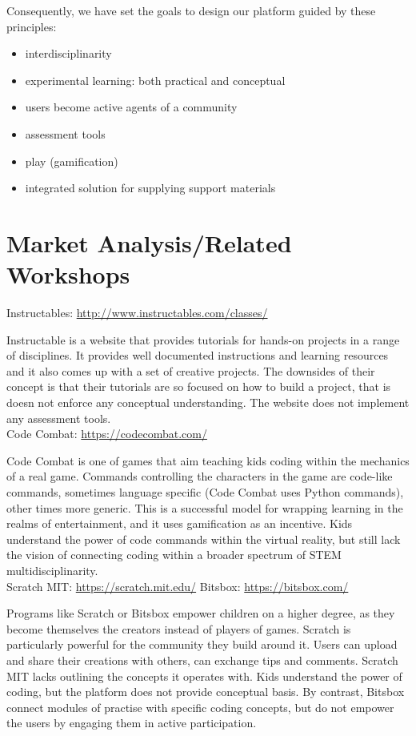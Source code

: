 Consequently, we have set the goals to design our platform guided by these principles:
\begin{itemize}
\item interdisciplinarity
\item experimental learning: both practical and conceptual
\item users become active agents of a community 
\item assessment tools
\item play (gamification)
\item integrated solution for supplying support materials 
\end{itemize}

\section{Market Analysis/Related Workshops}

Instructables: \url{http://www.instructables.com/classes/}

Instructable is a website that provides tutorials for hands-on projects in a range of disciplines. It provides well documented instructions and learning resources and it also comes up with a set of creative projects.
The downsides of their concept is that their tutorials are so focused on how to build a project, that is doesn not enforce any conceptual understanding. The website does not implement any assessment tools.\\

Code Combat: \url{https://codecombat.com/}

Code Combat is one of games that aim teaching kids coding within the mechanics of a real game. Commands controlling the characters in the game are code-like commands, sometimes language specific (Code Combat uses Python commands), other times more generic. 
This is a successful model for wrapping learning in the realms of entertainment, and it uses gamification as an incentive. Kids understand the power of code commands within the virtual reality, but still lack the vision of connecting coding within a broader spectrum of STEM multidisciplinarity.\\

Scratch MIT: \url{https://scratch.mit.edu/}
Bitsbox: \url{https://bitsbox.com/}

Programs like Scratch or Bitsbox empower children on a higher degree, as they become themselves the creators instead of players of games. 
Scratch is particularly powerful for the community they build around it. Users can upload and share their creations with others, can exchange tips and comments. 
Scratch MIT lacks outlining the concepts it operates with. Kids understand the power of coding, but the platform does not provide conceptual basis.
By contrast, Bitsbox connect modules of practise with specific coding concepts, but do not empower the users by engaging them in active participation. \\

